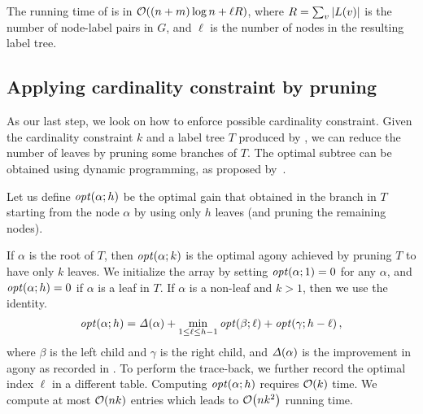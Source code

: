 \begin{proposition}
\label{prop:time}
The running time of
\algpartition is in $\bigO{(n + m) \log n + \ell R}$,
where $R = \sum_v {\left|L(v)\right|}$ is the number of node-label pairs in $G$,
and $\ell$ is the number of nodes in the resulting label tree.
\end{proposition}

\subsection{Applying cardinality constraint by pruning}
\label{sec:card}

As our last step, we look on how to enforce possible cardinality constraint.
Given the cardinality constraint $k$ and a label tree $T$ produced by \algpartition, we can reduce the
number of leaves by pruning some branches of $T$.  The optimal subtree can be
obtained using dynamic programming, as proposed by~\citet{nikolaj2017tiers}.

Let us define $\opt{\alpha; h}$ be the optimal gain that obtained in the branch in $T$ starting from the node $\alpha$
by using only $h$ leaves (and pruning the remaining nodes).

If $\alpha$ is the root of $T$, then $\opt{\alpha; k}$
is the optimal agony achieved by pruning $T$ to have only $k$ leaves.
We initialize the array by setting  $\opt{\alpha; 1} = 0$ for any $\alpha$, and $\opt{\alpha; h} = 0$ if $\alpha$ is a leaf in $T$. If $\alpha$ is a non-leaf and $k > 1$, then we use the identity.
\[
	\opt{\alpha; h} = \gain{\alpha} + \min_{1 \leq \ell \leq h - 1} \opt{\beta; \ell} + \opt{\gamma; h - \ell},
\]
where $\beta$ is the left child and $\gamma$ is the right child, and $\gain{\alpha}$ is the improvement in agony as recorded in \algpartition.
To perform the trace-back, we further record the optimal index $\ell$ in a different table. Computing  $\opt{\alpha; h}$ requires $\bigO{k}$ time. We compute
at most $\bigO{nk}$ entries which leads to $\bigO{nk^2}$ running time.
